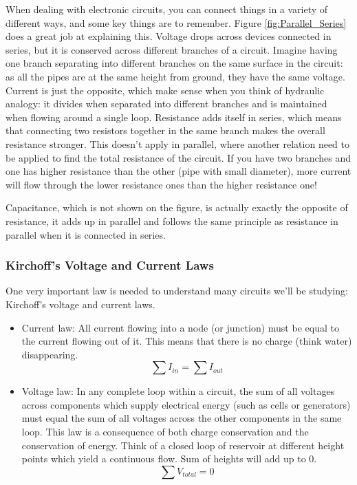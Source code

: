 When dealing with electronic circuits, you can connect things in a variety of different ways, and some key things are to remember. Figure \ref{fig:Parallel_Series} does a great job at explaining this. Voltage drops across devices connected in series, but it is conserved across different branches of a circuit. Imagine having one branch separating into different branches on the same surface in the circuit: as all the pipes are at the same height from ground, they have the same voltage. Current is just the opposite, which make sense when you think of hydraulic analogy: it divides when separated into different branches and is maintained when flowing around a single loop. Resistance adds itself in series, which means that connecting two resistors together in the same branch makes the overall resistance stronger. This doesn't apply in parallel, where another relation need to be applied to find the total resistance of the circuit. If you have two branches and one has higher resistance than the other (pipe with small diameter), more current will flow through the lower resistance ones than the higher resistance one! 

Capacitance, which is not shown on the figure, is actually exactly the opposite of resistance, it adds up in parallel and follows the same principle as resistance in parallel when it is connected in series. 

\subsubsection{Kirchoff's Voltage and Current Laws}

One very important law is needed to understand many circuits we'll be studying: Kirchoff's voltage and current laws. 

\begin{itemize}
    \item Current law: All current flowing into a node (or junction) must be equal to the current flowing out of it. This means that there is no charge (think water) disappearing.
    \begin{equation}
        \sum I_{in} = \sum I_{out}
    \end{equation}
    \item Voltage law: In any complete loop within a circuit, the sum of all voltages across components which supply electrical energy (such as cells or generators) must equal the sum of all voltages across the other components in the same loop. This law is a consequence of both charge conservation and the conservation of energy. Think of a closed loop of reservoir at different height points which yield a continuous flow. Sum of heights will add up to 0.
    \begin{equation}
        \sum V_{total} = 0
    \end{equation}
\end{itemize}

